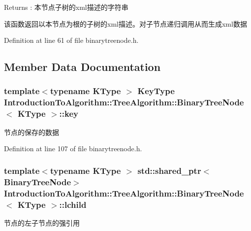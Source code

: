 \begin{DoxyReturn}{Returns}
\+: 本节点子树的{\ttfamily xml}描述的字符串
\end{DoxyReturn}
该函数返回以本节点为根的子树的{\ttfamily xml}描述。对子节点递归调用从而生成{\ttfamily xml}数据 

Definition at line 61 of file binarytreenode.\+h.



\subsection{Member Data Documentation}
\hypertarget{struct_introduction_to_algorithm_1_1_tree_algorithm_1_1_binary_tree_node_af3cb8030ab05ccaf1a69a86c9f468b8d}{}
\subsubsection[{key}]{\setlength{\rightskip}{0pt plus 5cm}template$<$typename K\+Type $>$ {\bf Key\+Type} {\bf Introduction\+To\+Algorithm\+::\+Tree\+Algorithm\+::\+Binary\+Tree\+Node}$<$ K\+Type $>$\+::key}\label{struct_introduction_to_algorithm_1_1_tree_algorithm_1_1_binary_tree_node_af3cb8030ab05ccaf1a69a86c9f468b8d}
节点的保存的数据 

Definition at line 107 of file binarytreenode.\+h.

\hypertarget{struct_introduction_to_algorithm_1_1_tree_algorithm_1_1_binary_tree_node_a3e056b1d34820497ac3a23a16180be2b}{}
\subsubsection[{lchild}]{\setlength{\rightskip}{0pt plus 5cm}template$<$typename K\+Type $>$ std\+::shared\+\_\+ptr$<${\bf Binary\+Tree\+Node}$>$ {\bf Introduction\+To\+Algorithm\+::\+Tree\+Algorithm\+::\+Binary\+Tree\+Node}$<$ K\+Type $>$\+::lchild}\label{struct_introduction_to_algorithm_1_1_tree_algorithm_1_1_binary_tree_node_a3e056b1d34820497ac3a23a16180be2b}
节点的左子节点的强引用 

